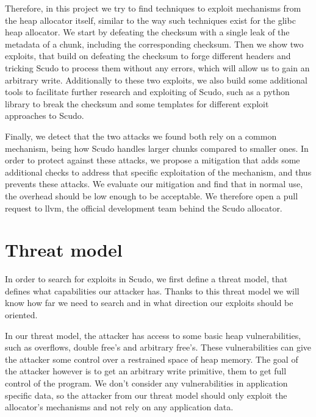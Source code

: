 \documentclass[a4paper,11pt,oneside]{report}
\begin{document}
Therefore, in this project we try to find techniques to exploit mechanisms from the heap
allocator itself, similar to the way such techniques exist for the glibc heap
allocator. We start by defeating the checksum with a single leak of the metadata of a
chunk, including the corresponding checksum. Then we show two exploits, that build on
defeating the checksum to forge different headers and tricking Scudo to process them
without any errors, which will allow us to gain an arbitrary write. Additionally to these
two exploits, we also build some additional tools to facilitate further research and
exploiting of Scudo, such as a python library to break the checksum and some templates for
different exploit approaches to Scudo.

Finally, we detect that the two attacks we found both rely on a common mechanism, being how
Scudo handles larger chunks compared to smaller ones. In order to protect against these
attacks, we propose a mitigation that adds some additional checks to address that specific
exploitation of the mechanism, and thus prevents these attacks. We evaluate our mitigation
and find that  in normal use, the overhead should be low enough to be acceptable. We
therefore open a pull request to llvm, the official development team behind the Scudo
allocator.

\chapter{Threat model}

In order to search for exploits in Scudo, we first define a threat model, that defines
what capabilities our attacker has. Thanks to this threat model we will
know how far we need to search and in what direction our exploits should be oriented.

In our threat model, the attacker has access to some basic heap vulnerabilities, such
as overflows, double free's and arbitrary free's. 
These vulnerabilities can give the
attacker some control over a restrained space of heap memory. The goal of the attacker
however is to get an arbitrary write primitive, them to get full control of the 
program. We don't consider any vulnerabilities in application specific data, so the
attacker from our threat model should only exploit the allocator's mechanisms and not rely
on any application data. 
\end{document}
